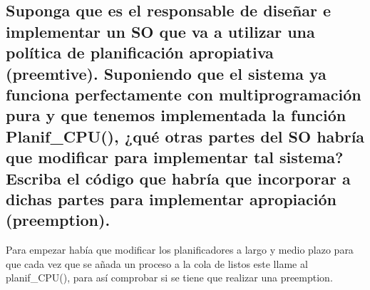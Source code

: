 \documentclass{article}
\begin{document}
			\subsection[Pregunta 7]{Suponga que es el responsable de diseñar e implementar un SO que va a utilizar una política de planificación apropiativa (preemtive). Suponiendo que el sistema ya funciona perfectamente con multiprogramación pura y que tenemos implementada la función Planif\_CPU(), ¿qué otras partes del SO habría que modificar para implementar tal sistema? Escriba el código que habría que incorporar a dichas partes para implementar apropiación (preemption).}
				Para empezar había que modificar los planificadores a largo y medio plazo para que cada vez que se añada un proceso a la cola de listos este llame al planif\_CPU(), para así comprobar si se tiene que realizar una preemption. 
				
				
					
					
\end{document}
